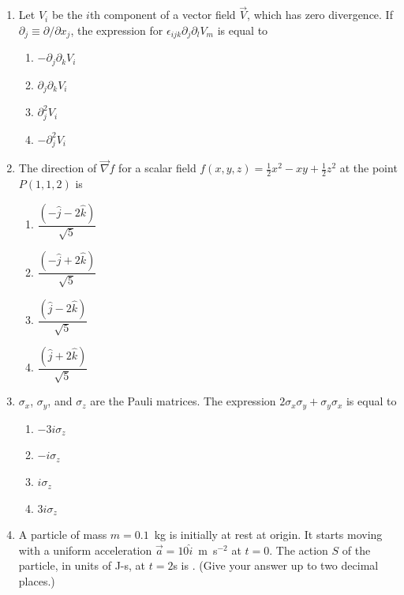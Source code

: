 \documentclass[journal,12pt,onecolumn]{IEEEtran}
\theoremstyle{remark}
\begin{document}
\begin{enumerate}
\item Let $V_i$ be the $i$th component of a vector field $\vec{V}$, which has zero divergence. If $\partial_j \equiv \partial / \partial x_j$, the expression for $\epsilon_{ijk} \partial_j \partial_l V_m$ is equal to

\begin{multicols}{4}
\begin{enumerate}
    \item $-\partial_j \partial_k V_i$
    \item $\partial_j \partial_k V_i$
    \item $\partial^2_j V_i$
    \item $-\partial^2_j V_i$
\end{enumerate}
\end{multicols}

\item The direction of $\vec{\nabla} f$ for a scalar field $f(x, y, z) = \frac{1}{2}x^2 - xy + \frac{1}{2}z^2$ at the point $P(1, 1, 2)$ is

\begin{multicols}{4}
\begin{enumerate}
    \item $\dfrac{(-\hat{j} - 2\hat{k})}{\sqrt{5}}$
    \item $\dfrac{(-\hat{j} + 2\hat{k})}{\sqrt{5}}$
    \item $\dfrac{(\hat{j} - 2\hat{k})}{\sqrt{5}}$
    \item $\dfrac{(\hat{j} + 2\hat{k})}{\sqrt{5}}$
\end{enumerate}
\end{multicols}

\item $\sigma_x$, $\sigma_y$, and $\sigma_z$ are the Pauli matrices. The expression $2 \sigma_x \sigma_y + \sigma_y \sigma_x$ is equal to

\begin{multicols}{4}
\begin{enumerate}
    \item $-3i\sigma_z$
    \item $-i\sigma_z$
    \item $i\sigma_z$
    \item $3i\sigma_z$
\end{enumerate}
\end{multicols}

\item A particle of mass $m = 0.1$~kg is initially at rest at origin. It starts moving with a uniform acceleration $\vec{a} = 10\hat{i}$~m~s$^{-2}$ at $t = 0$. The action $S$ of the particle, in units of J-s, at $t = 2$s is \underline{\hspace{2cm}}. (Give your answer up to two decimal places.)


\end{enumerate}
\end{document}
